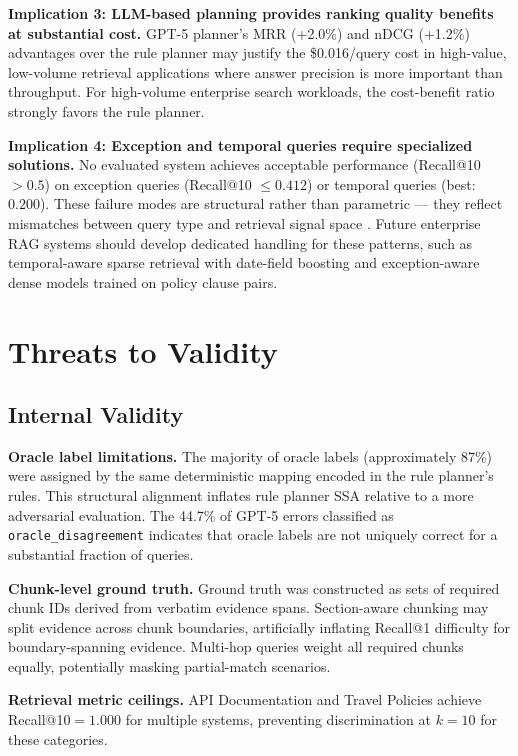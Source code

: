 \noindent\textbf{Implication 3: LLM-based planning provides ranking quality benefits at substantial cost.} GPT-5 planner's MRR (+2.0\%) and nDCG (+1.2\%) advantages over the rule planner may justify the \$0.016/query cost in high-value, low-volume retrieval applications where answer precision is more important than throughput. For high-volume enterprise search workloads, the cost-benefit ratio strongly favors the rule planner.

\noindent\textbf{Implication 4: Exception and temporal queries require specialized solutions.} No evaluated system achieves acceptable performance (Recall@10 $>{0.5}$) on exception queries (Recall@10 $\leq{0.412}$) or temporal queries (best: $0.200$). These failure modes are structural rather than parametric --- they reflect mismatches between query type and retrieval signal space \citep{manning2008ir}. Future enterprise RAG systems should develop dedicated handling for these patterns, such as temporal-aware sparse retrieval with date-field boosting and exception-aware dense models trained on policy clause pairs.

\section{Threats to Validity}
\label{sec:disc_threats}

\subsection{Internal Validity}

\textbf{Oracle label limitations.} The majority of oracle labels (approximately 87\%) were assigned by the same deterministic mapping encoded in the rule planner's rules. This structural alignment inflates rule planner SSA relative to a more adversarial evaluation. The 44.7\% of GPT-5 errors classified as \texttt{oracle\_disagreement} indicates that oracle labels are not uniquely correct for a substantial fraction of queries.

\textbf{Chunk-level ground truth.} Ground truth was constructed as sets of required chunk IDs derived from verbatim evidence spans. Section-aware chunking may split evidence across chunk boundaries, artificially inflating Recall@1 difficulty for boundary-spanning evidence. Multi-hop queries weight all required chunks equally, potentially masking partial-match scenarios.

\textbf{Retrieval metric ceilings.} API Documentation and Travel Policies achieve Recall@10$={1.000}$ for multiple systems, preventing discrimination at $k{=}10$ for these categories.

